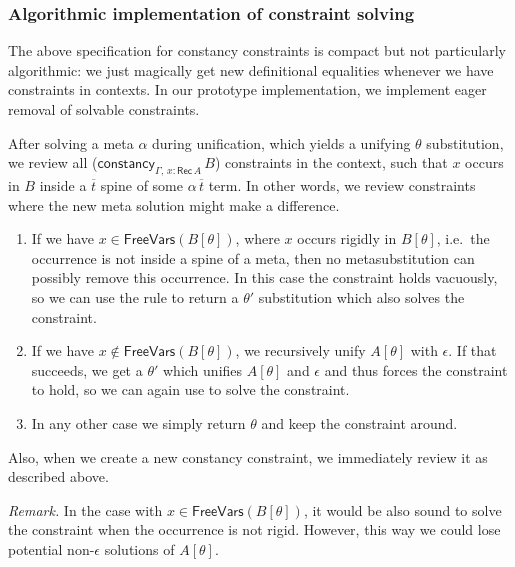 \documentclass[acmsmall,review,anonymous,prologue,dvipsnames]{acmart}\settopmatter{printfolios=true,printccs=false,printacmref=false}
\newcommand{\constancy}{\mathsf{constancy}}
\newcommand{\FreeVars}{\mathsf{FreeVars}}
\newcommand{\Rec}{\mathsf{Rec}}
\newcommand{\ol}[1]{\overline{#1}}
\theoremstyle{remark}
\begin{document}
\subsubsection{Algorithmic implementation of constraint solving}
\label{sec:algorithmic}
The above specification for constancy constraints is compact but not
particularly algorithmic: we just magically get new definitional equalities
whenever we have constraints in contexts. In our prototype implementation, we
implement eager removal of solvable constraints.

After solving a meta $\alpha$ during unification, which yields a unifying
$\theta$ substitution, we review all ($\constancy_{\Gamma,\,x : \Rec\,A}\,B$)
constraints in the context, such that $x$ occurs in $B$ inside a $\ol{t}$ spine
of some $\alpha\,\ol{t}$ term. In other words, we review constraints where the
new meta solution might make a difference.
\begin{enumerate}
\item If we have $x \in \FreeVars(B[\theta])$, where $x$ occurs rigidly in
  $B[\theta]$, i.e.\ the occurrence is not inside a spine of a meta, then no
  metasubstitution can possibly remove this occurrence. In this case the
  constraint holds vacuously, so we can use the 
  rule to return a $\theta'$ substitution which also solves the constraint.
  \item If we have $x \notin \FreeVars(B[\theta])$, we recursively unify
    $A[\theta]$ with $\epsilon$. If that succeeds, we get a $\theta'$ which
    unifies $A[\theta]$ and $\epsilon$ and thus forces the constraint to hold,
    so we can again use  to solve the constraint.
  \item
    In any other case we simply return $\theta$ and keep the constraint around.
\end{enumerate}
Also, when we create a new constancy constraint, we immediately review it
as described above.

\emph{Remark.} In the case with $x \in \FreeVars(B[\theta])$, it would be also
sound to solve the constraint when the occurrence is not rigid. However, this
way we could lose potential non-$\epsilon$ solutions of $A[\theta]$.
\end{document}
